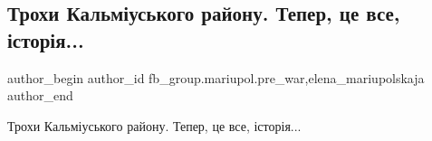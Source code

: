  
 
 
 
 

\subsection{Трохи Кальміуського району. Тепер, це все, історія...}
\label{sec:27_01_2023.fb.fb_group.mariupol.pre_war.1.trokhi_kalm_uskogo_r}
 
\ifcmt
 author_begin
   author_id fb_group.mariupol.pre_war,elena_mariupolskaja
 author_end
\fi

Трохи Кальміуського району. Тепер, це все, історія...
